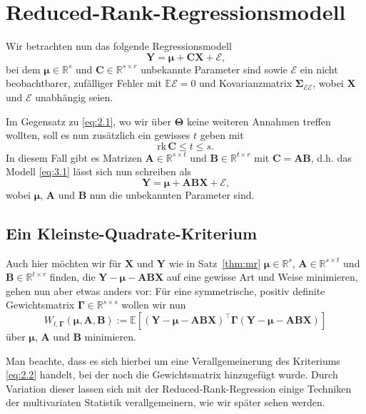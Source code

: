 \documentclass[]{article}
\newcommand{\E}{\mathbb{E}}
\newcommand{\R}{\mathbb{R}}
\newcommand{\X}{\mathbf{X}}
\newcommand{\Y}{\mathbf{Y}}
\newcommand{\T}{\mathbf{\Theta}}
\newcommand{\muu}{\bm{\mu}}
\newcommand{\Ssigma}{\mathbf{\Sigma}}
\newcommand{\C}{\mathbf{C}}
\newcommand{\rk}{\mathrm{rk}}
\newcommand{\A}{\mathbf{A}}
\newcommand{\B}{\mathbf{B}}
\newcommand{\Ggamma}{\mathbf{\Gamma}}
\begin{document}
\section{Reduced-Rank-Regressionsmodell}

Wir betrachten nun das folgende Regressionsmodell
\[\Y = \muu + \C \X + \mathcal{E} \text{,} \label{eq:3.1} \tag{3.1}\]
bei dem $\muu \in \R^s$ und $\C \in \R^{s \times r}$ unbekannte Parameter sind sowie $\mathcal{E}$ ein nicht beobachtbarer, zufälliger Fehler mit $\E \mathcal{E} = 0$ und Kovarianzmatrix $\Ssigma_{\mathcal{E} \mathcal{E}}$, wobei $\X$ und $\mathcal{E}$ unabhängig seien. 

Im Gegensatz zu \eqref{eq:2.1}, wo wir über $\T$ keine weiteren Annahmen treffen wollten, soll es nun zusätzlich ein gewisses $t$ geben mit
$$ \rk \, \C \leq t \leq s \text{.}$$
In diesem Fall gibt es Matrizen $\A \in \R^{s \times t}$ und $\B \in \R^{t \times r}$ mit $\C = \A \B$, d.h. das Modell \eqref{eq:3.1}
lässt sich nun schreiben als
\[\Y = \muu + \A \B \X + \mathcal{E} \text{,} \label{eq:3.2} \tag{3.2}\]
wobei $\muu$, $\A$ und $\B$ nun die unbekannten Parameter sind.

\subsection*{Ein Kleinste-Quadrate-Kriterium}

Auch hier möchten wir für $\X$ und $\Y$ wie in Satz~\ref{thm:mr} $\muu \in \R^s$, $\A \in \R^{s \times t}$ und $\B \in \R^{t \times r}$ finden, die $\Y - \muu - \A \B \X$ auf eine gewisse Art und Weise minimieren, gehen nun aber etwas anders vor:
Für eine symmetrische, positiv definite Gewichtsmatrix $\Ggamma \in \R^{s \times s}$ wollen wir nun 
$$ W_{t, \Ggamma}(\muu, \A, \B) := \E[(\Y - \muu - \A \B \X)^{\top} \Ggamma (\Y - \muu - \A \B \X)]$$
über $\muu$, $\A$ und $\B$ minimieren. 

Man beachte, dass es sich hierbei um eine Verallgemeinerung des Kriteriums \eqref{eq:2.2} handelt, bei der noch die Gewichtsmatrix hinzugefügt wurde. Durch Variation dieser lassen sich mit der Reduced-Rank-Regression einige Techniken der multivariaten Statistik verallgemeinern, wie wir später sehen werden.
\end{document}
